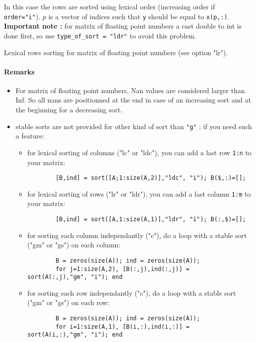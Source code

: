 \begin{mandescription}
In this case the rows are sorted using lexical order (increasing 
order if \verb+order="i"+). $p$ is a vector of indices such that \verb+y+ should be equal to
\verb+x(p,:)+.  {\bf Important note :} for matrix of floating point numbers a cast double 
to int is done first, so use {\tt type\_of\_sort = "ldr"} to avoid this problem.

Lexical rows sorting for matrix of floating point numbers (see option "lr").


\paragraph{Remarks}
\begin{itemize}
\item For matrix of floating point numbers, Nan values are considered larger
than Inf. So all nans are positionned at the end in case of an
increasing sort and at the beginning for a decreasing sort. 
\item stable sorts are not provided for other kind of sort than \verb+"g"+ ; if
you need such a feature:
  \begin{itemize}
  \item for lexical sorting of columns ("lc" or "ldc"), you can add a last
        row \verb+1:n+ to your matrix:
        \begin{verbatim}
        [B,ind] = sort([A;1:size(A,2)],"ldc", "i"); B($,:)=[];
        \end{verbatim}
  \item for lexical sorting of rows ("lr" or "ldr"), you can add a last
        column \verb+1:m+ to your matrix:
        \begin{verbatim}
        [B,ind] = sort([A,1:size(A,1)],"ldr", "i"); B(:,$)=[];
        \end{verbatim}
  \item for sorting each column independantly ("c"), do a loop with
        a stable sort ("gm" or "gs") on each column:
        \begin{verbatim}
        B = zeros(size(A)); ind = zeros(size(A));
        for j=1:size(A,2), [B(:,j),ind(:,j)] = sort(A(:,j),"gm", "i"); end
        \end{verbatim}
  \item for sorting each row independantly ("c"), do a loop with
        a stable sort ("gm" or "gs") on each row:
        \begin{verbatim}
        B = zeros(size(A)); ind = zeros(size(A));
        for i=1:size(A,1), [B(i,:),ind(i,:)] = sort(A(i,:),"gm", "i"); end
        \end{verbatim}
  \end{itemize}
\end{itemize}


\end{mandescription}


